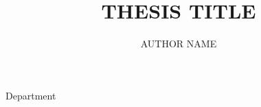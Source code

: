 \documentclass[12pt,phd,oneside,final]{waynestatedissert}
\begin{document}
%
%
\author{\uppercase{AUTHOR NAME}}
\title{\uppercase{Thesis title}}
\unit{Department}



%
%
\maketitle

%
%
%
%
%

\disscopyright

%
%
%

%   
\end{document}
